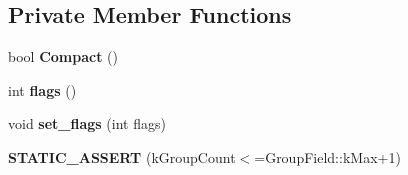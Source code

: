 \subsection*{Private Member Functions}
\begin{DoxyCompactItemize}
\item 
bool {\bfseries Compact} ()\hypertarget{classv8_1_1internal_1_1_dependent_code_af110c71e051b149ef8b841f0a8a4b707}{}\label{classv8_1_1internal_1_1_dependent_code_af110c71e051b149ef8b841f0a8a4b707}

\item 
int {\bfseries flags} ()\hypertarget{classv8_1_1internal_1_1_dependent_code_a6a98cf75b783394d156a53081d1ab2cf}{}\label{classv8_1_1internal_1_1_dependent_code_a6a98cf75b783394d156a53081d1ab2cf}

\item 
void {\bfseries set\+\_\+flags} (int flags)\hypertarget{classv8_1_1internal_1_1_dependent_code_a49aee67d998b13d0810e812882c57abc}{}\label{classv8_1_1internal_1_1_dependent_code_a49aee67d998b13d0810e812882c57abc}

\item 
{\bfseries S\+T\+A\+T\+I\+C\+\_\+\+A\+S\+S\+E\+RT} (k\+Group\+Count$<$=Group\+Field\+::k\+Max+1)\hypertarget{classv8_1_1internal_1_1_dependent_code_af9571825c488bab3de615ce4ce0a18b4}{}\label{classv8_1_1internal_1_1_dependent_code_af9571825c488bab3de615ce4ce0a18b4}

\end{DoxyCompactItemize}
